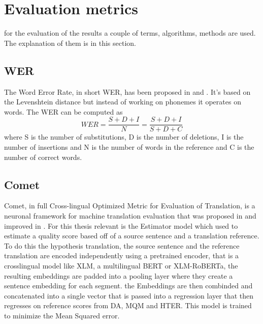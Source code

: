 \section{Evaluation metrics}
 for the evaluation of the results a couple of terms, algorithms, methods are used. The explanation of them is in this section. 
 
\subsection{WER}
\label{wer}
The Word Error Rate, in short WER, has been proposed in \cite{woodard1982} and \cite{morris2004}.
It's based on the Levenshtein distance but instead of working on phonemes it operates on words.
The WER can be computed as $$WER=\frac{S+D+I}{N}=\frac{S+D+I}{S+D+C}$$ where S is the number of substitutions, D is the number of deletions, I is the number of insertions and N is the number of words in the reference and C is the number of correct words.

\subsection{Comet}
Comet, in full Cross-lingual Optimized Metric for Evaluation of Translation, is a neuronal framework for machine translation evaluation that was proposed in \cite{rei-etal-2020-comet} and improved in \cite{rei-etal-2022-comet}.
For this thesis relevant is the Estimator model which used to estimate a quality score based off of a source sentence and a translation reference. 
To do this the hypothesis translation, the source sentence and the reference translation are encoded independently using a pretrained encoder, that is a crosslingual model like XLM, a multilingual BERT or XLM-RoBERTa, the resulting embeddings are padded into a pooling layer where they create a sentence embedding for each segment. the Embeddings are then combinded and concatenated into a single vector that is passed into a regression layer that then regresses on reference scores from DA, MQM and HTER. 
This model is trained to minimize the Mean Squared error. 

